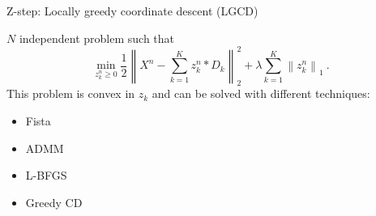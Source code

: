 \documentclass{beamer}
\def\keypoint#1{\hspace{0pt plus 1 filll}\textcolor{gray}{#1}}
\def\mycite#1{\keypoint{\small\citep{#1}}}
\begin{document}
\begin{frame}{Z-step: Locally greedy coordinate descent (LGCD)}

$N$ independent problem such that
\[
	\label{eq:sparse_code}
	\min_{z_k^n \ge 0} \frac{1}{2} \left\|X^n - \sum_{k=1}^K z_k^n * D_k\right\|_2^2
	+ \lambda\sum_{k=1}^K\left\|z_k^n\right\|_1~.
\]
This problem is convex in $z_k$ and can be solved with different techniques:
\begin{itemize}
	\item Fista \mycite{Chalasani2013}
	\item ADMM \mycite{Bristow2013}
	\item L-BFGS \mycite{Jas2017}
	\item Greedy CD \mycite{Kavukcuoglu2010}
\end{itemize}


\end{frame}
\end{document}

